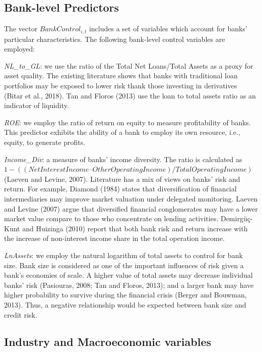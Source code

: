 \documentclass[
  12pt,
  a4paper,
]{scrreprt}
\begin{document}
\subsection{Bank-level Predictors}\label{bank-level-predictors}

The vector \(BankControl_{i,t}\) includes a set of variables which
account for banks' particular characteristics. The following bank-level
control variables are employed:

\emph{NL\_to\_GL}: we use the ratio of the Total Net Loans/Total Assets
as a proxy for asset quality. The existing literature shows that banks
with traditional loan portfolios may be exposed to lower risk thank
those investing in derivatives (Bitar et al., 2018). Tan and Floros
(2013) use the loan to total assets ratio as an indicator of liquidity.

\emph{ROE}: we employ the ratio of return on equity to measure
profitability of banks. This predictor exhibits the ability of a bank to
employ its own resource, i.e., equity, to generate profits.

\emph{Income\_Div}: a measure of banks' income diversity. The ratio is
calculated as
\(1-((Net Interest Income – Other Operating Income)/Total Operating Income)\)
(Laeven and Levine, 2007). Literature has a mix of views on banks' risk
and return. For example, Diamond (1984) states that diversification of
financial intermediaries may improve market valuation under delegated
monitoring. Laeven and Levine (2007) argue that diversified financial
conglomerates may have a lower market value compare to those who
concentrate on lending activities. Demirgüç-Kunt and Huizinga (2010)
report that both bank risk and return increase with the increase of
non-interest income share in the total operation income.

\emph{LnAssets}: we employ the natural logarithm of total assets to
control for bank size. Bank size is considered as one of the important
influences of risk given a bank's economies of scale. A higher value of
total assets may decrease individual banks' risk (Pasiouras, 2008; Tan
and Floros, 2013); and a larger bank may have higher probability to
survive during the financial crisis (Berger and Bouwman, 2013). Thus, a
negative relationship would be expected between bank size and credit
risk.

\subsection{Industry and Macroeconomic
variables}\label{industry-and-macroeconomic-variables}
\end{document}
